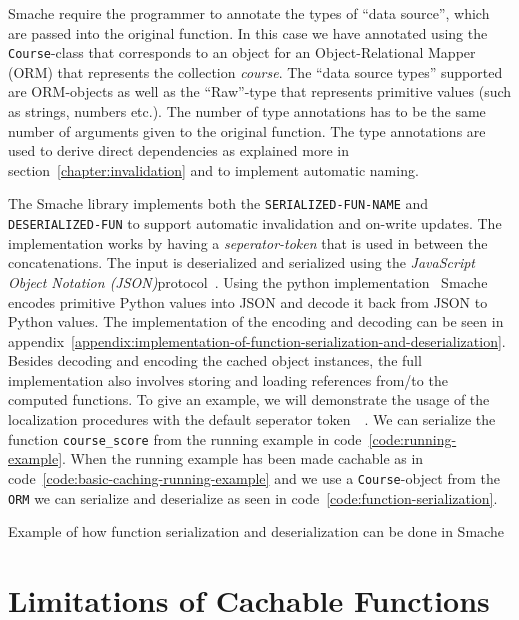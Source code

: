 Smache require the programmer to annotate the types of ``data source'', which are passed into the original function. In this case we have annotated using the \verb$Course$-class that corresponds to an object for an Object-Relational Mapper (ORM) that represents the collection \emph{course}. The ``data source types'' supported are ORM-objects as well as the ``Raw''-type that represents primitive values (such as strings, numbers etc.). The number of type annotations has to be the same number of arguments given to the original function. The type annotations are used to derive direct dependencies as explained more in section~\ref{chapter:invalidation} and to implement automatic naming.

The Smache library implements both the \verb$SERIALIZED-FUN-NAME$ and \verb$DESERIALIZED-FUN$ to support automatic invalidation and on-write updates. The implementation works by having a \emph{seperator-token} that is used in between the concatenations. The input is deserialized and serialized using the \emph{JavaScript Object Notation (JSON)}protocol~\cite{docs:json}. Using the python implementation~\cite{docs:python-json} Smache encodes primitive Python values into JSON and decode it back from JSON to Python values. The implementation of the encoding and decoding can be seen in appendix~\ref{appendix:implementation-of-function-serialization-and-deserialization}. Besides decoding and encoding the cached object instances, the full implementation also involves storing and loading references from/to the computed functions.
To give an example, we will demonstrate the usage of the localization procedures with the default seperator token $~~~$. We can serialize the function \verb$course_score$ from the running example in code~\ref{code:running-example}. When the running example has been made cachable as in code~\ref{code:basic-caching-running-example} and we use a \verb$Course$-object from the \verb$ORM$ we can serialize and deserialize as seen in code~\ref{code:function-serialization}.

\begin{code}{Example of how function serialization and deserialization can be done in Smache}
  
  \label{code:function-serialization}
\end{code}



\section{Limitations of Cachable Functions}
\label{sec:cachable-function-discussion}

